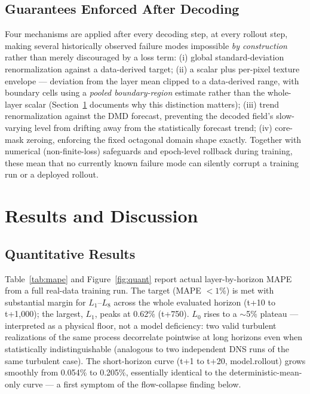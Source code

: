 \documentclass[11pt]{article}
\begin{document}
\subsection{Guarantees Enforced After Decoding}
Four mechanisms are applied after every decoding step, at every rollout step, making several historically observed failure modes impossible \emph{by construction} rather than merely discouraged by a loss term: (i) global standard-deviation renormalization against a data-derived target; (ii) a scalar plus per-pixel texture envelope — deviation from the layer mean clipped to a data-derived range, with boundary cells using a \emph{pooled boundary-region} estimate rather than the whole-layer scalar (Section~\ref{sec:results} documents why this distinction matters); (iii) trend renormalization against the DMD forecast, preventing the decoded field's slow-varying level from drifting away from the statistically forecast trend; (iv) core-mask zeroing, enforcing the fixed octagonal domain shape exactly. Together with numerical (non-finite-loss) safeguards and epoch-level rollback during training, these mean that no currently known failure mode can silently corrupt a training run or a deployed rollout.

\section{Results and Discussion}
\label{sec:results}
\subsection{Quantitative Results}
Table~\ref{tab:mape} and Figure~\ref{fig:quant} report actual layer-by-horizon MAPE from a full real-data training run. The target (MAPE $<1\%$) is met with substantial margin for $L_1$–$L_8$ across the whole evaluated horizon (t+10 to t+1{,}000); the largest, $L_1$, peaks at 0.62\% (t+750). $L_0$ rises to a $\sim$5\% plateau — interpreted as a physical floor, not a model deficiency: two valid turbulent realizations of the same process decorrelate pointwise at long horizons even when statistically indistinguishable (analogous to two independent DNS runs of the same turbulent case). The short-horizon curve (t+1 to t+20, model.rollout) grows smoothly from 0.054\% to 0.205\%, essentially identical to the deterministic-mean-only curve — a first symptom of the flow-collapse finding below.
\end{document}
